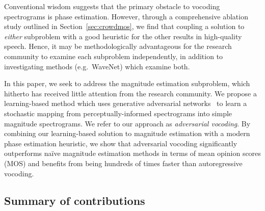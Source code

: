 \documentclass[a4paper]{article}
\begin{document}
Conventional wisdom suggests that the primary obstacle to vocoding spectrograms is phase estimation. 
However, 
through a comprehensive ablation study outlined in Section~\ref{sec:crowdmos}, 
we find that coupling a solution to \emph{either} subproblem with a good heuristic for the other results in high-quality speech. 
Hence, 
it may be methodologically advantageous for the research community to examine each subproblem independently, 
in addition to investigating methods (e.g.~WaveNet) which examine both.


In this paper, 
we seek to address the magnitude estimation subproblem, 
which hitherto has received little attention from the research community. 
We propose a learning-based method which uses generative adversarial networks~\cite{goodfellow2014generative} to learn a stochastic mapping from perceptually-informed spectrograms into simple magnitude spectrograms. 
We refer to our approach as \emph{adversarial vocoding}. 
By combining our learning-based solution to magnitude estimation with a modern phase estimation heuristic,
we show that adversarial vocoding significantly outperforms na\"ive magnitude estimation methods in terms of mean opinion scores (MOS) and benefits from being hundreds of times faster than autoregressive vocoding.

\subsection{Summary of contributions}
\end{document}
